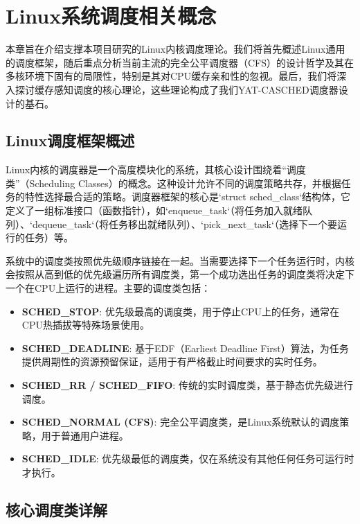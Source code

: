 
\section{Linux系统调度相关概念} \label{sec:linux_scheduling_concepts}

本章旨在介绍支撑本项目研究的Linux内核调度理论。我们将首先概述Linux通用的调度框架，随后重点分析当前主流的完全公平调度器（CFS）的设计哲学及其在多核环境下固有的局限性，特别是其对CPU缓存亲和性的忽视。最后，我们将深入探讨缓存感知调度的核心理论，这些理论构成了我们YAT-CASCHED调度器设计的基石。

\subsection{Linux调度框架概述}

Linux内核的调度器是一个高度模块化的系统，其核心设计围绕着“调度类”（Scheduling Classes）的概念。这种设计允许不同的调度策略共存，并根据任务的特性选择最合适的策略。调度器框架的核心是`struct sched\_class`结构体，它定义了一组标准接口（函数指针），如`enqueue\_task`（将任务加入就绪队列）、`dequeue\_task`（将任务移出就绪队列）、`pick\_next\_task`（选择下一个要运行的任务）等。

系统中的调度类按照优先级顺序链接在一起。当需要选择下一个任务运行时，内核会按照从高到低的优先级遍历所有调度类，第一个成功选出任务的调度类将决定下一个在CPU上运行的进程。主要的调度类包括：

\begin{itemize}
    \item \textbf{SCHED\_STOP}: 优先级最高的调度类，用于停止CPU上的任务，通常在CPU热插拔等特殊场景使用。
    \item \textbf{SCHED\_DEADLINE}: 基于EDF（Earliest Deadline First）算法，为任务提供周期性的资源预留保证，适用于有严格截止时间要求的实时任务。
    \item \textbf{SCHED\_RR / SCHED\_FIFO}: 传统的实时调度类，基于静态优先级进行调度。
    \item \textbf{SCHED\_NORMAL (CFS)}: 完全公平调度类，是Linux系统默认的调度策略，用于普通用户进程。
    \item \textbf{SCHED\_IDLE}: 优先级最低的调度类，仅在系统没有其他任何任务可运行时才执行。
\end{itemize}

\subsection{核心调度类详解}

